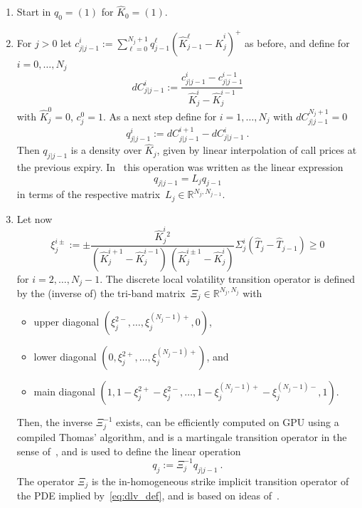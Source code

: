 \documentclass[11pt,a4paper]{article}
\newcommand{\R}{\mathbb{R}}
\begin{document}
\begin{enumerate}
    \item Start in $q_0=(1)$ for $\hat K_0=(1)$.
    \item For $j>0$ 
    let $c^i_{j|j-1} := \sum_{\ell=0}^{N_j+1} q^\ell_{j-1} ( \hat K^\ell_{j-1} - \hat K^i_j )^+$
    as before, and define for $i=0,\ldots,N_j$
    $$
        dC_{j|j-1}^i := \frac{ c^{i}_{j|j-1} - c^{i-1}_{j|j-1} }
                     { \hat K^{i}_j - \hat K^{i-1}_j } 
    $$
    with $\hat K^{0}_j=0$, $c^{0}_{j}=1$. As a next step define for $i=1,\ldots,N_j$ with $dC_{j|j-1}^{N_j+1}=0$
    $$
        q^i_{j|j-1} := dC_{j|j-1}^{i+1} - dC_{j|j-1}^i \ .
    $$
    Then $q_{j|j-1}$ is a density over $\hat K_j$, given by linear interpolation of
    call prices at the previous expiry. In~\cite{SANOS2026} this operation
    was written as the linear expression
    $$
        q_{j|j-1} = L_j q_{j-1} 
    $$
    in terms of the respective matrix~$L_j\in\R^{N_j,N_{j-1}}$.
 
    \item Let now
        $$     
        \xi^{i\pm}_j := \pm    \frac{ \hat K^i_j{}^2 }{ (\hat K^{i+1}_j - \hat K^{i-1}_j)\,(\hat K^{i\pm 1}_j - \hat K^i_j) }\Sigma^i_j (\hat T_j-\hat T_{j-1} ) \geq 0
            $$
        for $i=2,\ldots,N_j-1$.
        The discrete local volatility transition operator is defined
        by the (inverse of) the tri-band matrix~$\Xi_j\in\R^{N_j,N_j}$ with
    \begin{itemize}
        \item     upper diagonal
    $(\xi^{2-}_j,\ldots,\xi^{(N_j-1)+}_j,0)$,
        \item  lower diagonal $(0,\xi^{2+}_j,\ldots,\xi^{({N_j}-1)+}_j)$, and

        \item main diagonal $(1,1-\xi^{2+}_j-\xi^{2-}_j,\ldots,1-\xi^{(N_j-1)+}_j-\xi^{(N_j-1)-}_j,1)$.
    \end{itemize}
    Then, the inverse $\Xi^{-1}_j$ exists, can be efficiently computed on GPU using a compiled
    Thomas' algorithm, and
    is a martingale transition operator
    in the sense of~\cite{DLV}, and is used to define
    the linear operation
    $$
        q_j := \Xi_j^{-1} q_{j|j-1} \ .
    $$
    The operator $\Xi_j$ is the in-homogeneous strike implicit transition operator of the PDE
    implied by~\eqref{eq:dlv_def}, and is based on ideas of~\cite{AndreasenHuge}.
\end{enumerate}
\end{document}
